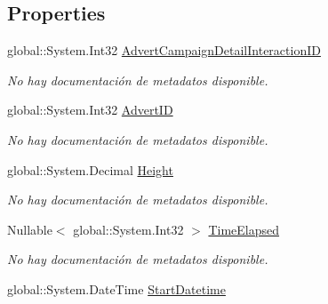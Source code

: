 \subsection*{Properties}
\begin{DoxyCompactItemize}
\item 
global\-::\-System.\-Int32 \hyperlink{class_microsoft_1_1_samples_1_1_kinect_1_1_basic_interactions_1_1_advert_campaign_detail_interactions_acdaab4edb8336d94cd0553d62695cbcc}{Advert\-Campaign\-Detail\-Interaction\-I\-D}
\begin{DoxyCompactList}\small\item\em No hay documentación de metadatos disponible. \end{DoxyCompactList}\item 
global\-::\-System.\-Int32 \hyperlink{class_microsoft_1_1_samples_1_1_kinect_1_1_basic_interactions_1_1_advert_campaign_detail_interactions_ac9620cfa0794107afbb3c4e85705a7b1}{Advert\-I\-D}
\begin{DoxyCompactList}\small\item\em No hay documentación de metadatos disponible. \end{DoxyCompactList}\item 
global\-::\-System.\-Decimal \hyperlink{class_microsoft_1_1_samples_1_1_kinect_1_1_basic_interactions_1_1_advert_campaign_detail_interactions_a9718143b005f0305c9125b886bf33bd1}{Height}
\begin{DoxyCompactList}\small\item\em No hay documentación de metadatos disponible. \end{DoxyCompactList}\item 
Nullable$<$ global\-::\-System.\-Int32 $>$ \hyperlink{class_microsoft_1_1_samples_1_1_kinect_1_1_basic_interactions_1_1_advert_campaign_detail_interactions_aefcfbf4807c518573ce1c88db2427599}{Time\-Elapsed}
\begin{DoxyCompactList}\small\item\em No hay documentación de metadatos disponible. \end{DoxyCompactList}\item 
global\-::\-System.\-Date\-Time \hyperlink{class_microsoft_1_1_samples_1_1_kinect_1_1_basic_interactions_1_1_advert_campaign_detail_interactions_a3832317dc4252a3b005683af6e003cbb}{Start\-Datetime}

\end{DoxyCompactItemize}
